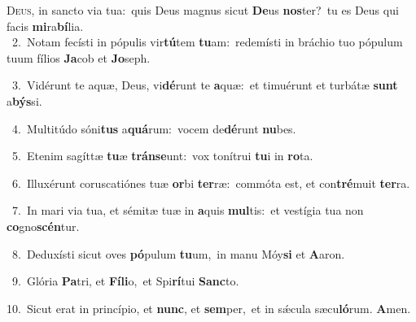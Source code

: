 \lettrine{\initial\textcolor{\initialcolor}{D}}{eus,} in sancto via tua:~\dagger quis Deus magnus sicut \textbf{De}\-us \textbf{nos}\-ter?~\star tu es Deus qui facis \textbf{mi}\-ra\-\textbf{bí}\-lia.\\
{\numbfont\textcolor{\numbcolor}{~2.}}~Notam fecísti in pópulis vir\-\textbf{tú}\-tem \textbf{tu}\-am:~\star redemísti in bráchio tuo pópulum tuum fílios \textbf{Ja}\-cob et \textbf{Jo}\-seph.\par
{\numbfont\textcolor{\numbcolor}{~3.}}~Vidérunt te aquæ, Deus, vi\-\textbf{dé}\-runt te \textbf{a}\-quæ:~\star et timuérunt et turbátæ \textbf{sunt} a\-\textbf{býs}\-si.\par
{\numbfont\textcolor{\numbcolor}{~4.}}~Multitúdo sóni\textbf{tus} a\-\textbf{quá}\-rum:~\star vocem de\-\textbf{dé}\-runt \textbf{nu}\-bes.\par
{\numbfont\textcolor{\numbcolor}{~5.}}~Etenim sagíttæ \textbf{tu}\-æ \textbf{tráns}\-\textbf{e}unt:~\star vox tonítrui \textbf{tu}\-i in \textbf{ro}\-ta.\par
{\numbfont\textcolor{\numbcolor}{~6.}}~Illuxérunt coruscatiónes tuæ \textbf{or}\-bi \textbf{ter}\-ræ:~\star commóta est, et con\-\textbf{tré}\-muit \textbf{ter}\-ra.\par
{\numbfont\textcolor{\numbcolor}{~7.}}~In mari via tua, et sémitæ tuæ in \textbf{a}\-quis \textbf{mul}\-tis:~\star et vestígia tua non \textbf{co}\-gno\-\textbf{scén}\-tur.\par
{\numbfont\textcolor{\numbcolor}{~8.}}~Deduxísti sicut oves \textbf{pó}\-pulum \textbf{tu}\-um,~\star in manu Móy\textbf{si} et \textbf{A}\-aron.\par
{\numbfont\textcolor{\numbcolor}{~9.}}~Glória \textbf{Pa}\-tri, et \textbf{Fí}\-\textbf{li}o,~\star et Spi\-\textbf{rí}\-tui \textbf{Sanc}\-to.\par
{\numbfont\textcolor{\numbcolor}{10.}}~Sicut erat in princípio, et \textbf{nunc}\-, et \textbf{sem}\-per,~\star et in sǽcula sæcu\-\textbf{ló}\-rum. \textbf{A}\-men.\par
